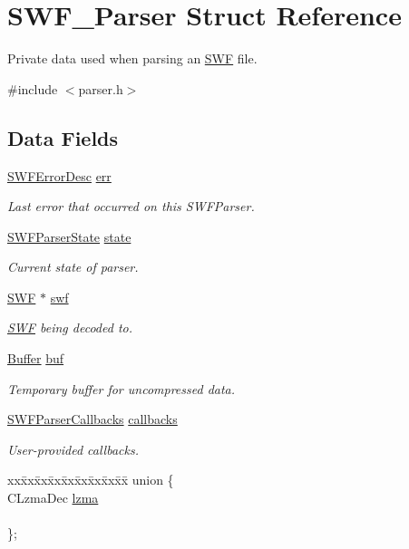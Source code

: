 \hypertarget{struct_s_w_f___parser}{}\section{S\+W\+F\+\_\+\+Parser Struct Reference}
\label{struct_s_w_f___parser}


Private data used when parsing an \hyperlink{struct_s_w_f}{S\+W\+F} file.  




{\ttfamily \#include $<$parser.\+h$>$}

\subsection*{Data Fields}
\begin{DoxyCompactItemize}
\item 
\hyperlink{struct_s_w_f_error_desc}{S\+W\+F\+Error\+Desc} \hyperlink{struct_s_w_f___parser_a228c1268386d125a52e25b11f576a60d}{err}
\begin{DoxyCompactList}\small\item\em Last error that occurred on this S\+W\+F\+Parser. \end{DoxyCompactList}\item 
\hyperlink{parser_8h_a2d847bc5fa348d069da8cea188ca5248}{S\+W\+F\+Parser\+State} \hyperlink{struct_s_w_f___parser_aeebc37448b1cdf66f228a06a53c483e9}{state}
\begin{DoxyCompactList}\small\item\em Current state of parser. \end{DoxyCompactList}\item 
\hyperlink{struct_s_w_f}{S\+W\+F} $\ast$ \hyperlink{struct_s_w_f___parser_a89022933c95956b746307de9714197da}{swf}
\begin{DoxyCompactList}\small\item\em \hyperlink{struct_s_w_f}{S\+W\+F} being decoded to. \end{DoxyCompactList}\item 
\hyperlink{struct_buffer}{Buffer} \hyperlink{struct_s_w_f___parser_aee4f16e3f852e7ac2e0eeac8795a15cf}{buf}
\begin{DoxyCompactList}\small\item\em Temporary buffer for uncompressed data. \end{DoxyCompactList}\item 
\hyperlink{struct_s_w_f_parser_callbacks}{S\+W\+F\+Parser\+Callbacks} \hyperlink{struct_s_w_f___parser_a7ac999619795fa6e6bb4132af080eae6}{callbacks}
\begin{DoxyCompactList}\small\item\em User-\/provided callbacks. \end{DoxyCompactList}\item 
\begin{tabbing}
xx\=xx\=xx\=xx\=xx\=xx\=xx\=xx\=xx\=\kill
union \{\\
\>CLzmaDec \hyperlink{struct_s_w_f___parser_a1bbb269f3afac19005232a222d87d054}{lzma}\\
\>\\
\}; \\


\end{tabbing}
\end{DoxyCompactItemize}
